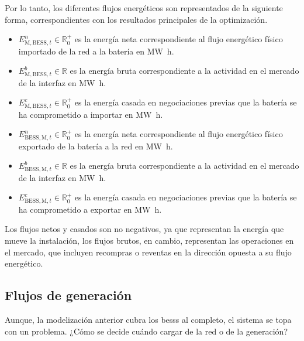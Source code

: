Por lo tanto, los diferentes flujos energéticos son representados de la siguiente forma, correspondientes con los resultados principales de la optimización.

\begin{itemize}

  \item \( E^{n}_{\text{M}, \text{BESS}, t} \in \mathbb{R}^{+}_{0} \) es la energía neta correspondiente al flujo energético físico importado de la red a la batería en \si{{\mega\watt\hour}}.

  \item \( E^{b}_{\text{M}, \text{BESS}, t} \in \mathbb{R} \) es la energía bruta correspondiente a la actividad en el mercado de la interfaz en \si{{\mega\watt\hour}}.

  \item \( E^{c}_{\text{M}, \text{BESS}, t} \in \mathbb{R}^{+}_{0} \) es la energía casada en negociaciones previas que la batería se ha comprometido a importar en \si{{\mega\watt\hour}}.

  \item \( E^{n}_{\text{BESS}, \text{M}, t} \in \mathbb{R}^{+}_{0} \) es la energía neta correspondiente al flujo energético físico exportado de la batería a la red en \si{{\mega\watt\hour}}.

  \item \( E^{b}_{\text{BESS}, \text{M}, t} \in \mathbb{R} \) es la energía bruta correspondiente a la actividad en el mercado de la interfaz en \si{{\mega\watt\hour}}.

  \item \( E^{c}_{\text{BESS}, \text{M}, t} \in \mathbb{R}^{+}_{0} \) es la energía casada en negociaciones previas que la batería se ha comprometido a exportar en \si{{\mega\watt\hour}}.

\end{itemize}

Los flujos netos y casados son no negativos, ya que representan la energía que mueve la instalación, los flujos brutos, en cambio, representan las operaciones en el mercado, que incluyen recompras o reventas en la dirección opuesta a su flujo energético.

\subsection{Flujos de generación}%
\label{makereference5.1.3}

Aunque, la modelización anterior cubra los \glspl{bess} al completo, el sistema se topa con un problema. ¿Cómo se decide cuándo cargar de la red o de la generación?

